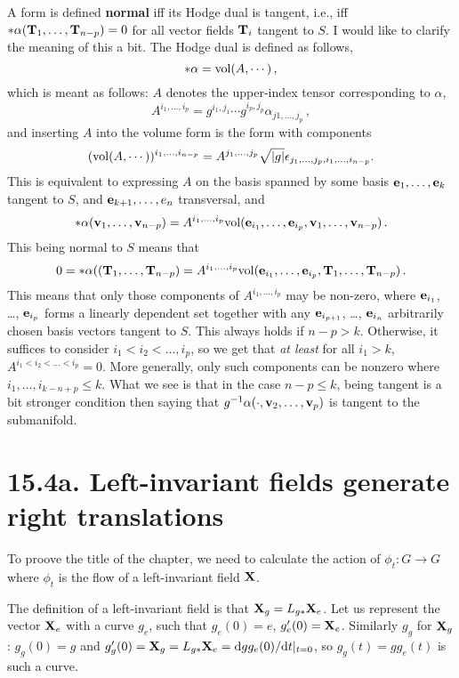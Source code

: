 \documentclass[a4paper,12pt]{article}
\def\d{\mathrm{d}}
\begin{document}
A form is defined {\bf normal} iff its Hodge dual is tangent, i.e., iff $*\alpha({\bf T}_1, \dots, {\bf T}_{n-p}) = 0$ for all vector fields ${\bf T}_i$ tangent to $S$. I would like to clarify the meaning of this a bit. The Hodge dual is defined as follows,
\[
 *\alpha ={\rm vol}(A, \cdots)\,,
\]
which is meant as follows: $A$ denotes the upper-index tensor corresponding to $\alpha$,
\[
 A^{i_1, \dots, i_p} = g^{i_1, j_1}\cdots g^{i_p, j_p}\alpha_{j1,\dots, j_p}\,,
\]
and inserting $A$ into the volume form is the form with components
\[
 ({\rm vol}(A, \cdots))^{i_1,\dots,i_{n-p}} = A^{j_1,\dots,j_p}\sqrt{|g|}\epsilon_{j_1,\dots, j_p, i_1, \dots, i_{n-p}}.
\]
This is equivalent to expressing $A$ on the basis spanned by some basis ${\bf e}_1,\dots, {\bf e}_k$ tangent to $S$, and ${\bf e}_{k+1}, \dots, e_{n}$ transversal, and
\[
 *\alpha({\bf v}_1, \dots, {\bf v}_{n-p}) = A^{i_1,\dots, i_p}{\rm vol}({\bf e}_{i_1}, \dots, {\bf e}_{i_p}, {\bf v}_1, \dots, {\bf v}_{n-p})\,.
\]
This being normal to $S$ means that
\[
 0 = *\alpha(({\bf T}_1, \dots, {\bf T}_{n-p}) = A^{i_1,\dots, i_p}{\rm vol}({\bf e}_{i_1}, \dots, {\bf e}_{i_p}, {\bf T}_1, \dots, {\bf T}_{n-p})\,.
\]
This means that only those components of $A^{i_1, \dots, i_p}$ may be non-zero, where ${\bf e}_{i_1}$, \dots, ${\bf e}_{i_p}$ forms a linearly dependent set together with any ${\bf e}_{i_{p+1}}$, \dots, ${\bf e}_{i_n}$ arbitrarily chosen basis vectors tangent to $S$. This always holds if $n-p >k$. Otherwise, it suffices to consider $i_1 < i_2 < \dots, i_p$, so we get that {\sl at least}\/ for all $i_1 > k$, $A^{i_1 < i_2 <\dots < i_p} = 0$. More generally, only such components can be nonzero where $i_1,\dots, i_{k-n+p} \le k$. What we see is that in the case $n-p\le k$, being tangent is a bit stronger condition then saying that $g^{-1}\alpha(\cdot, {\bf v}_2, \dots, {\bf v}_{p})$ is tangent to the submanifold.


\section*{15.4a. Left-invariant fields generate right translations}
To proove the title of the chapter, we need to calculate the action of $\phi_t : G\to G$ where $\phi_t$ is the flow of a left-invariant field ${\bf X}$.

The definition of a left-invariant field is that ${\bf X}_g = L_{g*} {\bf X}_e$. Let us represent the vector ${\bf X}_e$ with a curve $g_e$, such that $g_e(0) = e$, $g_e'(0) = {\bf X}_e$. Similarly $g_g$ for ${\bf X}_g$: $g_g(0) = g$ and $g_g'(0) = {\bf X}_g = L_{g*} {\bf X}_e = \d g g_e(0) / \d t|_{t=0}$, so $g_g(t) = g g_e(t)$ is such a curve.
\end{document}

